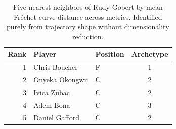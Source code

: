 \begin{table}[htbp]
  \centering\small
  \begin{tabular}{rllc}
    \toprule
    Rank & Player & Position & Archetype \\
    \midrule
    1 & Chris Boucher & F & 1 \\
    2 & Onyeka Okongwu & C & 2 \\
    3 & Ivica Zubac & C & 2 \\
    4 & Adem Bona & C & 3 \\
    5 & Daniel Gafford & C & 2 \\
    \bottomrule
  \end{tabular}
  \caption{Five nearest neighbors of Rudy Gobert by mean Fr\'{e}chet curve distance across metrics. Identified purely from trajectory shape without dimensionality reduction.}
  \label{tab:Rudy_Gobert_frechet_curve_neighbors}
\end{table}

